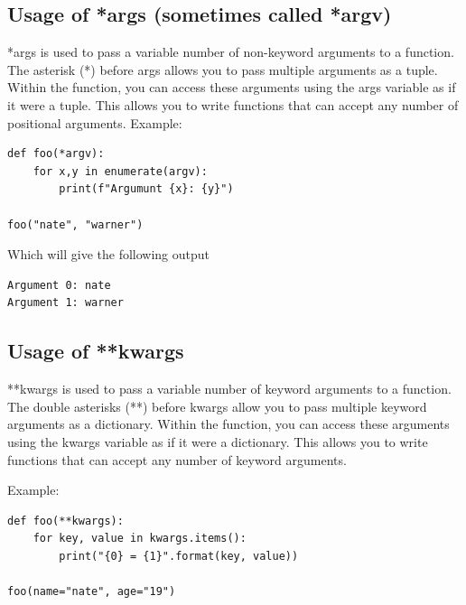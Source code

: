 \documentclass{report}
\begin{document}
    \subsection{Usage of *args (sometimes called *argv)}
    \bigbreak \noindent
    *args is used to pass a variable number of non-keyword arguments to a function. The asterisk (*) before args allows you to pass multiple arguments as a tuple. Within the function, you can access these arguments using the args variable as if it were a tuple. This allows you to write functions that can accept any number of positional arguments.
    \bigbreak \noindent 
    Example:
    \begin{verbatim}
def foo(*argv):
    for x,y in enumerate(argv):
        print(f"Argumunt {x}: {y}")

foo("nate", "warner")

    \end{verbatim}
    Which will give the following output
    \begin{verbatim}
Argument 0: nate
Argument 1: warner
    \end{verbatim}

    \subsection{Usage of **kwargs}
    \bigbreak \noindent
    **kwargs is used to pass a variable number of keyword arguments to a function. The double asterisks (**) before kwargs allow you to pass multiple keyword arguments as a dictionary. Within the function, you can access these arguments using the kwargs variable as if it were a dictionary. This allows you to write functions that can accept any number of keyword arguments.

    \bigbreak \noindent 
    Example:
    \begin{verbatim}
def foo(**kwargs):
    for key, value in kwargs.items():
        print("{0} = {1}".format(key, value))

foo(name="nate", age="19")
    \end{verbatim}

    \bigbreak \noindent 
    
    \bigbreak \noindent \bigbreak \noindent 
\end{document}
